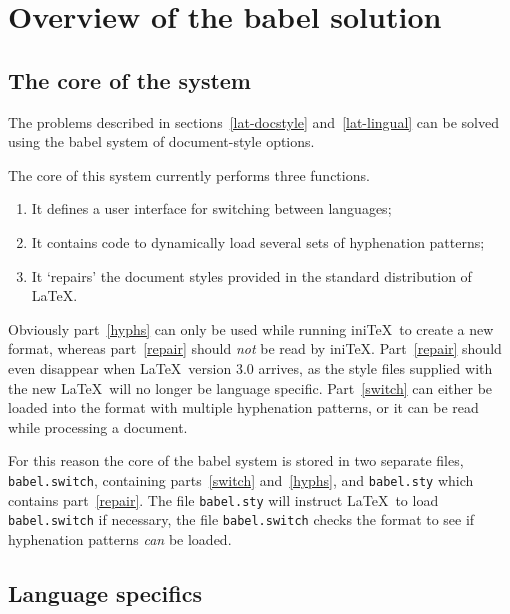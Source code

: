 \documentclass{ltugboat}
\newcommand{\file}[1]{\texttt{#1}}
\newcommand{\babel}{\textsf{babel}}
\begin{document}
\section{Overview of the \babel{} solution}

\subsection{The core of the system}

The problems described in sections~\ref{lat-docstyle}
and~\ref{lat-lingual} can be solved using the \babel{} system of
document-style options.

The core of this system currently performs three functions.
\begin{enumerate}

\item\label{switch} It defines a user interface for switching between
  languages;

\item\label{hyphs} It contains code to dynamically load several sets
  of hyphenation patterns;

\item\label{repair} It `repairs' the document styles provided in the
  standard distribution of \LaTeX.

\end{enumerate}

Obviously part~\ref{hyphs} can only be used while running ini\TeX\ to
create a new format, whereas part~\ref{repair} should \emph{not} be
read by ini\TeX.  Part~\ref{repair} should even disappear when \LaTeX\
version 3.0 arrives, as the style files supplied with the new \LaTeX\
will no longer be language specific. Part~\ref{switch} can either be
loaded into the format with multiple hyphenation patterns, or it can
be read while processing a document.

For this reason the core of the \babel{} system is stored in two
separate files, \file{babel.switch}, containing parts~\ref{switch}
and~\ref{hyphs}, and \file{babel.sty} which contains
part~\ref{repair}. The file \file{babel.sty} will instruct \LaTeX\ to
load \file{babel.switch} if necessary, the file \file{babel.switch}
checks the format to see if hyphenation patterns \emph{can} be loaded.

\subsection{Language specifics}
\end{document}
